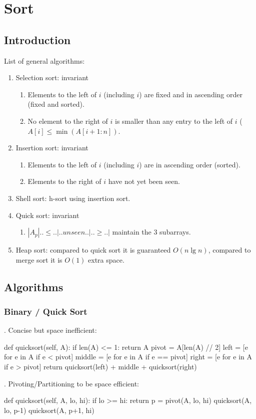 \chapter{Sort}


\section{Introduction}
List of general algorithms:
\begin{enumerate}
\item Selection sort: invariant
\begin{enumerate}
\item Elements to the left of $i$ (including $i$) are fixed and in ascending order (fixed and sorted).
\item No element to the right of $i$ is smaller than any entry to the left of $i$ ($A[i]  \leq\min(A[i+1:n])$.
\end{enumerate}
\item Insertion sort: invariant
\begin{enumerate}
\item Elements to the left of $i$ (including $i$) are in ascending order (sorted).
\item Elements to the right of $i$ have not yet been seen.
\end{enumerate}
\item Shell sort: h-sort using insertion sort.
\item Quick sort: invariant
\begin{enumerate}
\item $|A_p|..\leq..|..unseen..|..\geq..|$ maintain the 3 subarrays.
\end{enumerate}
\item Heap sort: compared to quick sort it is guaranteed $O(n \lg n)$, compared to merge sort it is $O(1)$ extra space. 
\end{enumerate}

\section{Algorithms}
\subsection{Binary / Quick Sort}
. Concise but space inefficient: 
\begin{python}
def quicksort(self, A):
    if len(A) <= 1:
        return A
    pivot = A[len(A) // 2]
    left = [e for e in A if e < pivot]
    middle = [e for e in A if e == pivot]
    right = [e for e in A if e > pivot]
    return quicksort(left) + middle + quicksort(right)
\end{python}
. Pivoting/Partitioning to be space efficient:
\begin{python}
def quicksort(self, A, lo, hi):
    if lo >= hi:
        return
    p = pivot(A, lo, hi)
    quicksort(A, lo, p-1)
    quicksort(A, p+1, hi)
\end{python}

